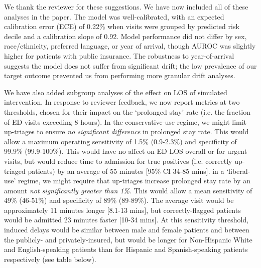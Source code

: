 We thank the reviewer for these suggestions. We have now included all of these analyses in the paper. The model was well-calibrated, with an expected calibration error (ECE) of 0.22\% when visits were grouped by predicted risk decile and a calibration slope of 0.92. Model performance did not differ by sex, race/ethnicity, preferred language, or year of arrival, though AUROC was slightly higher for patients with public insurance. The robustness to year-of-arrival suggests the model does not suffer from significant drift; the low prevalence of our target outcome prevented us from performing more granular drift analyses.

We have also added subgroup analyses of the effect on LOS of simulated intervention. In response to reviewer feedback, we now report metrics at two thresholds, chosen for their impact on the `prolonged stay' rate (i.e. the fraction of ED visits exceeding 8 hours). In the conservative-use regime, we might limit up-triages to ensure \textit{no significant difference} in prolonged stay rate. This would allow a maximum operating sensitivity of 1.5\% (0.9-2.3\%) and specificity of 99.9\% (99.9-100\%). This would have no affect on ED LOS overall or for urgent visits, but would reduce time to admission for true positives (i.e. correctly up-triaged patients) by an average of 55 minutes [95\% CI 34-85 mins].  in a `liberal-use' regime, we might require that up-triages increase prolonged stay rate by an amount \textit{not significantly greater than 1\%}. This would allow a mean sensitivity of 49\% (46-51\%) and specificity of 89\% (89-89\%). The average visit would be approximately 11 minutes longer [8.1-13 mins], but correctly-flagged patients would be admitted 23 minutes faster [10-34 mins]. At this sensitivity threshold, induced delays would be similar between male and female patients and between the publicly- and privately-insured, but would be longer for Non-Hispanic White and English-speaking patients than for Hispanic and Spanish-speaking patients respectively (see table below).

